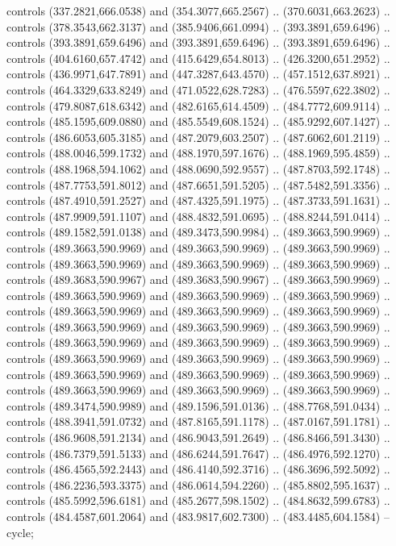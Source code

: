 \begin{scope}[shift={(-162.56685,-567.58888)}]
\begin{scope}
      controls (337.2821,666.0538) and (354.3077,665.2567) .. (370.6031,663.2623) ..
      controls (378.3543,662.3137) and (385.9406,661.0994) .. (393.3891,659.6496) ..
      controls (393.3891,659.6496) and (393.3891,659.6496) .. (393.3891,659.6496) ..
      controls (404.6160,657.4742) and (415.6429,654.8013) .. (426.3200,651.2952) ..
      controls (436.9971,647.7891) and (447.3287,643.4570) .. (457.1512,637.8921) ..
      controls (464.3329,633.8249) and (471.0522,628.7283) .. (476.5597,622.3802) ..
      controls (479.8087,618.6342) and (482.6165,614.4509) .. (484.7772,609.9114) ..
      controls (485.1595,609.0880) and (485.5549,608.1524) .. (485.9292,607.1427) ..
      controls (486.6053,605.3185) and (487.2079,603.2507) .. (487.6062,601.2119) ..
      controls (488.0046,599.1732) and (488.1970,597.1676) .. (488.1969,595.4859) ..
      controls (488.1968,594.1062) and (488.0690,592.9557) .. (487.8703,592.1748) ..
      controls (487.7753,591.8012) and (487.6651,591.5205) .. (487.5482,591.3356) ..
      controls (487.4910,591.2527) and (487.4325,591.1975) .. (487.3733,591.1631) ..
      controls (487.9909,591.1107) and (488.4832,591.0695) .. (488.8244,591.0414) ..
      controls (489.1582,591.0138) and (489.3473,590.9984) .. (489.3663,590.9969) ..
      controls (489.3663,590.9969) and (489.3663,590.9969) .. (489.3663,590.9969) ..
      controls (489.3663,590.9969) and (489.3663,590.9969) .. (489.3663,590.9969) ..
      controls (489.3683,590.9967) and (489.3683,590.9967) .. (489.3663,590.9969) ..
      controls (489.3663,590.9969) and (489.3663,590.9969) .. (489.3663,590.9969) ..
      controls (489.3663,590.9969) and (489.3663,590.9969) .. (489.3663,590.9969) ..
      controls (489.3663,590.9969) and (489.3663,590.9969) .. (489.3663,590.9969) ..
      controls (489.3663,590.9969) and (489.3663,590.9969) .. (489.3663,590.9969) ..
      controls (489.3663,590.9969) and (489.3663,590.9969) .. (489.3663,590.9969) ..
      controls (489.3663,590.9969) and (489.3663,590.9969) .. (489.3663,590.9969) ..
      controls (489.3663,590.9969) and (489.3663,590.9969) .. (489.3663,590.9969) ..
      controls (489.3474,590.9989) and (489.1596,591.0136) .. (488.7768,591.0434) ..
      controls (488.3941,591.0732) and (487.8165,591.1178) .. (487.0167,591.1781) ..
      controls (486.9608,591.2134) and (486.9043,591.2649) .. (486.8466,591.3430) ..
      controls (486.7379,591.5133) and (486.6244,591.7647) .. (486.4976,592.1270) ..
      controls (486.4565,592.2443) and (486.4140,592.3716) .. (486.3696,592.5092) ..
      controls (486.2236,593.3375) and (486.0614,594.2260) .. (485.8802,595.1637) ..
      controls (485.5992,596.6181) and (485.2677,598.1502) .. (484.8632,599.6783) ..
      controls (484.4587,601.2064) and (483.9817,602.7300) .. (483.4485,604.1584) --
      cycle;

  \end{scope}
\end{scope}

